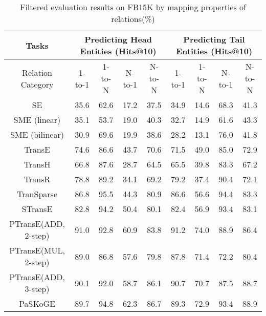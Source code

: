 \documentclass[11pt,a4paper]{article}
\begin{document}
\linespread{0.975}
\begin{table*}[]
\centering \caption{Filtered evaluation results on FB15K by mapping
properties of relations(\%)}
\begin{tabular}{|c|cccc|cccc|}
\hline
Tasks             & \multicolumn{4}{|c|}{Predicting Head Entities (Hits@10)} & \multicolumn{4}{|c|}{Predicting Tail Entities (Hits@10)} \\
\hline
Relation Category & 1-to-1       & 1-to-N      & N-to-1      & N-to-N      & 1-to-1       & 1-to-N      & N-to-1      & N-to-N      \\
\hline
SE                & 35.6         & 62.6        & 17.2        & 37.5        & 34.9         & 14.6        & 68.3        & 41.3        \\
SME (linear)      & 35.1         & 53.7        & 19.0          & 40.3        & 32.7         & 14.9        & 61.6        & 43.3        \\
SME (bilinear)    & 30.9         & 69.6        & 19.9        & 38.6        & 28.2         & 13.1        & 76.0          & 41.8        \\
TransE            & 74.6         & 86.6        & 43.7        & 70.6        & 71.5         & 49.0          & 85.0          & 72.9        \\
TransH            & 66.8         & 87.6        & 28.7        & 64.5        & 65.5         & 39.8        & 83.3        & 67.2        \\
TransR            & 78.8         & 89.2        & 34.1        & 69.2        & 79.2         & 37.4        & 90.4        & 72.1        \\
TranSparse            & 86.8         & 95.5        & 44.3        & 80.9        & 86.6         & 56.6        & 94.4        & 83.3        \\
STransE            & 82.8         & 94.2        & 50.4        & 80.1        & 82.4         & 56.9        & 93.4        & 83.1        \\
PTransE(ADD, 2-step)        & 91.0           & 92.8        & 60.9        & 83.8        & 91.2         & 74.0          & 88.9        & 86.4        \\
PTransE(MUL, 2-step)        & 89.0           & 86.8        & 57.6        & 79.8        & 87.8         & 71.4          & 72.2        & 80.4        \\
PTransE(ADD, 3-step)       & 90.1           & 92.0        & 58.7        & 86.1        & 90.7         & 70.7          & 87.5        & 88.7        \\
PaSKoGE           & 89.7           & 94.8        & 62.3        & 86.7        & 89.3         & 72.9          & 93.4        & 88.9        \\

\end{tabular}
\end{table*}
\end{document}
